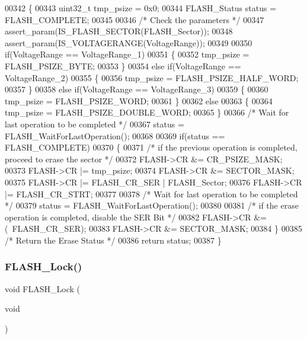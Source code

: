\begin{DoxyCode}
00342 \{
00343   uint32\_t tmp\_psize = 0x0;
00344   FLASH_Status status = FLASH_COMPLETE;
00345 
00346   \textcolor{comment}{/* Check the parameters */}
00347   assert_param(IS_FLASH_SECTOR(FLASH\_Sector));
00348   assert_param(IS_VOLTAGERANGE(VoltageRange));
00349   
00350   \textcolor{keywordflow}{if}(VoltageRange == VoltageRange_1)
00351   \{
00352      tmp\_psize = FLASH_PSIZE_BYTE;
00353   \}
00354   \textcolor{keywordflow}{else} \textcolor{keywordflow}{if}(VoltageRange == VoltageRange_2)
00355   \{
00356     tmp\_psize = FLASH_PSIZE_HALF_WORD;
00357   \}
00358   \textcolor{keywordflow}{else} \textcolor{keywordflow}{if}(VoltageRange == VoltageRange_3)
00359   \{
00360     tmp\_psize = FLASH_PSIZE_WORD;
00361   \}
00362   \textcolor{keywordflow}{else}
00363   \{
00364     tmp\_psize = FLASH_PSIZE_DOUBLE_WORD;
00365   \}
00366   \textcolor{comment}{/* Wait for last operation to be completed */}
00367   status = FLASH_WaitForLastOperation();
00368   
00369   \textcolor{keywordflow}{if}(status == FLASH_COMPLETE)
00370   \{ 
00371     \textcolor{comment}{/* if the previous operation is completed, proceed to erase the sector */}
00372     FLASH->CR &= CR_PSIZE_MASK;
00373     FLASH->CR |= tmp\_psize;
00374     FLASH->CR &= SECTOR_MASK;
00375     FLASH->CR |= FLASH_CR_SER | FLASH\_Sector;
00376     FLASH->CR |= FLASH_CR_STRT;
00377     
00378     \textcolor{comment}{/* Wait for last operation to be completed */}
00379     status = FLASH_WaitForLastOperation();
00380     
00381     \textcolor{comment}{/* if the erase operation is completed, disable the SER Bit */}
00382     FLASH->CR &= (~FLASH_CR_SER);
00383     FLASH->CR &= SECTOR_MASK; 
00384   \}
00385   \textcolor{comment}{/* Return the Erase Status */}
00386   \textcolor{keywordflow}{return} status;
00387 \}
\end{DoxyCode}
\mbox{\label{group__FLASH__Group2_ga46899557353c4312ddbe3f25e65df1d8}} 
\subsubsection{F\+L\+A\+S\+H\+\_\+\+Lock()}
{\footnotesize\ttfamily void F\+L\+A\+S\+H\+\_\+\+Lock (\begin{DoxyParamCaption}\item[{void}]{ }\end{DoxyParamCaption})}



